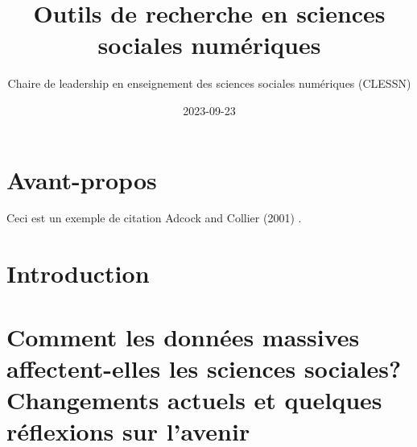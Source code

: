 \documentclass[
  letterpaper,
]{scrbook}
\title{Outils de recherche en sciences sociales numériques}
\author{Chaire de leadership en enseignement des sciences sociales
numériques (CLESSN)}
\date{2023-09-23}
\renewcommand*\contentsname{Table of contents}
\newcommand\contentsname{Table of contents}
\begin{document}
\frontmatter
\maketitle
\ifdefined\Shaded\renewenvironment{Shaded}{\begin{tcolorbox}[borderline west={3pt}{0pt}{shadecolor}, interior hidden, boxrule=0pt, enhanced, frame hidden, sharp corners, breakable]}{\end{tcolorbox}}\fi

\renewcommand*\contentsname{Table of contents}
{
\setcounter{tocdepth}{2}
\tableofcontents
}
\mainmatter
{}

\hypertarget{avant-propos}{%
\chapter*{Avant-propos}\label{avant-propos}}


Ceci est un exemple de citation Adcock and Collier (2001) .


\hypertarget{introduction}{%
\chapter*{Introduction}\label{introduction}}



\hypertarget{comment-les-donnuxe9es-massives-affectent-elles-les-sciences-sociales-changements-actuels-et-quelques-ruxe9flexions-sur-lavenir}{%
\chapter{Comment les données massives affectent-elles les sciences
sociales? Changements actuels et quelques réflexions sur
l'avenir}\label{comment-les-donnuxe9es-massives-affectent-elles-les-sciences-sociales-changements-actuels-et-quelques-ruxe9flexions-sur-lavenir}}
\end{document}
